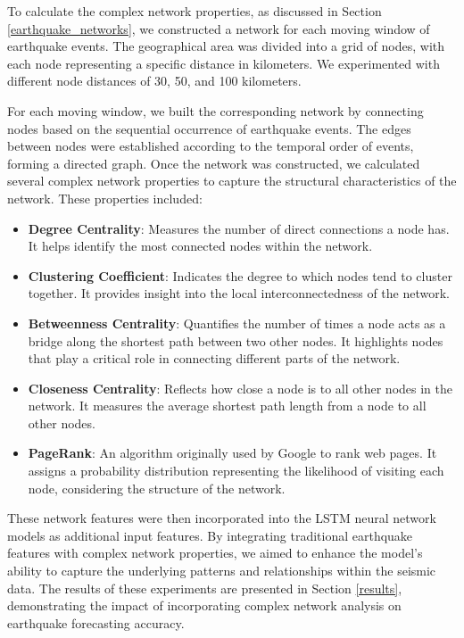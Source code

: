 \documentclass[sn-mathphys-num]{sn-jnl}
\begin{document}
To calculate the complex network properties, as discussed in Section \ref{earthquake_networks}, we constructed a network for each moving window of earthquake events. The geographical area was divided into a grid of nodes, with each node representing a specific distance in kilometers. We experimented with different node distances of 30, 50, and 100 kilometers.

For each moving window, we built the corresponding network by connecting nodes based on the sequential occurrence of earthquake events. The edges between nodes were established according to the temporal order of events, forming a directed graph. Once the network was constructed, we calculated several complex network properties to capture the structural characteristics of the network. These properties included:

\begin{itemize}
    \item \textbf{Degree Centrality}: Measures the number of direct connections a node has. It helps identify the most connected nodes within the network.
    \item \textbf{Clustering Coefficient}: Indicates the degree to which nodes tend to cluster together. It provides insight into the local interconnectedness of the network.
    \item \textbf{Betweenness Centrality}: Quantifies the number of times a node acts as a bridge along the shortest path between two other nodes. It highlights nodes that play a critical role in connecting different parts of the network.
    \item \textbf{Closeness Centrality}: Reflects how close a node is to all other nodes in the network. It measures the average shortest path length from a node to all other nodes.
    \item \textbf{PageRank}: An algorithm originally used by Google to rank web pages. It assigns a probability distribution representing the likelihood of visiting each node, considering the structure of the network.
\end{itemize}

These network features were then incorporated into the LSTM neural network models as additional input features. By integrating traditional earthquake features with complex network properties, we aimed to enhance the model's ability to capture the underlying patterns and relationships within the seismic data. The results of these experiments are presented in Section \ref{results}, demonstrating the impact of incorporating complex network analysis on earthquake forecasting accuracy.
\end{document}
